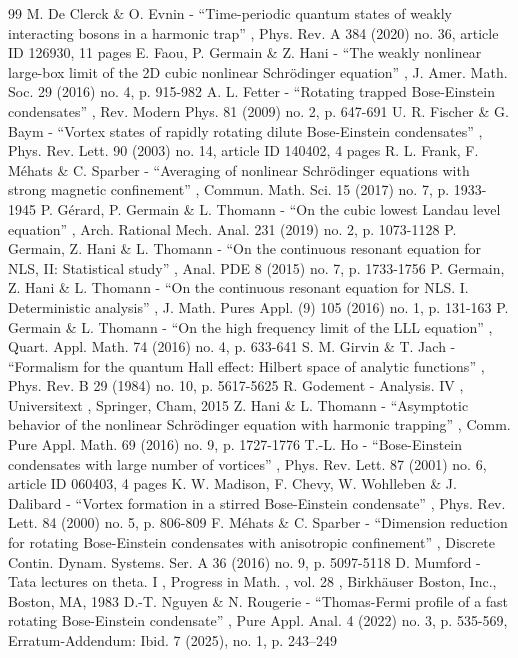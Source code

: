 \begin{thebibliography}{99}
 M. De Clerck \& O. Evnin - “Time-periodic quantum states of weakly interacting bosons in a harmonic trap” , Phys. Rev. A 384 (2020) no. 36, article ID 126930, 11 pages
 E. Faou, P. Germain \& Z. Hani - “The weakly nonlinear large-box limit of the 2D cubic nonlinear Schrödinger equation” , J. Amer. Math. Soc. 29 (2016) no. 4, p. 915-982
 A. L. Fetter - “Rotating trapped Bose-Einstein condensates” , Rev. Modern Phys. 81 (2009) no. 2, p. 647-691
 U. R. Fischer \& G. Baym - “Vortex states of rapidly rotating dilute Bose-Einstein condensates” , Phys. Rev. Lett. 90 (2003) no. 14, article ID 140402, 4 pages
 R. L. Frank, F. Méhats \& C. Sparber - “Averaging of nonlinear Schrödinger equations with strong magnetic confinement” , Commun. Math. Sci. 15 (2017) no. 7, p. 1933-1945
 P. Gérard, P. Germain \& L. Thomann - “On the cubic lowest Landau level equation” , Arch. Rational Mech. Anal. 231 (2019) no. 2, p. 1073-1128
 P. Germain, Z. Hani \& L. Thomann - “On the continuous resonant equation for NLS, II: Statistical study” , Anal. PDE 8 (2015) no. 7, p. 1733-1756
 P. Germain, Z. Hani \& L. Thomann - “On the continuous resonant equation for NLS. I. Deterministic analysis” , J. Math. Pures Appl. (9) 105 (2016) no. 1, p. 131-163
 P. Germain \& L. Thomann - “On the high frequency limit of the LLL equation” , Quart. Appl. Math. 74 (2016) no. 4, p. 633-641
 S. M. Girvin \& T. Jach - “Formalism for the quantum Hall effect: Hilbert space of analytic functions” , Phys. Rev. B 29 (1984) no. 10, p. 5617-5625
 R. Godement - Analysis. IV , Universitext , Springer, Cham, 2015
 Z. Hani \& L. Thomann - “Asymptotic behavior of the nonlinear Schrödinger equation with harmonic trapping” , Comm. Pure Appl. Math. 69 (2016) no. 9, p. 1727-1776
 T.-L. Ho - “Bose-Einstein condensates with large number of vortices” , Phys. Rev. Lett. 87 (2001) no. 6, article ID 060403, 4 pages
 K. W. Madison, F. Chevy, W. Wohlleben \& J. Dalibard - “Vortex formation in a stirred Bose-Einstein condensate” , Phys. Rev. Lett. 84 (2000) no. 5, p. 806-809
 F. Méhats \& C. Sparber - “Dimension reduction for rotating Bose-Einstein condensates with anisotropic confinement” , Discrete Contin. Dynam. Systems. Ser. A 36 (2016) no. 9, p. 5097-5118
 D. Mumford - Tata lectures on theta. I , Progress in Math. , vol. 28 , Birkhäuser Boston, Inc., Boston, MA, 1983
 D.-T. Nguyen \& N. Rougerie - “Thomas-Fermi profile of a fast rotating Bose-Einstein condensate” , Pure Appl. Anal. 4 (2022) no. 3, p. 535-569, Erratum-Addendum: Ibid. 7 (2025), no. 1, p. 243–249

\end{thebibliography}
